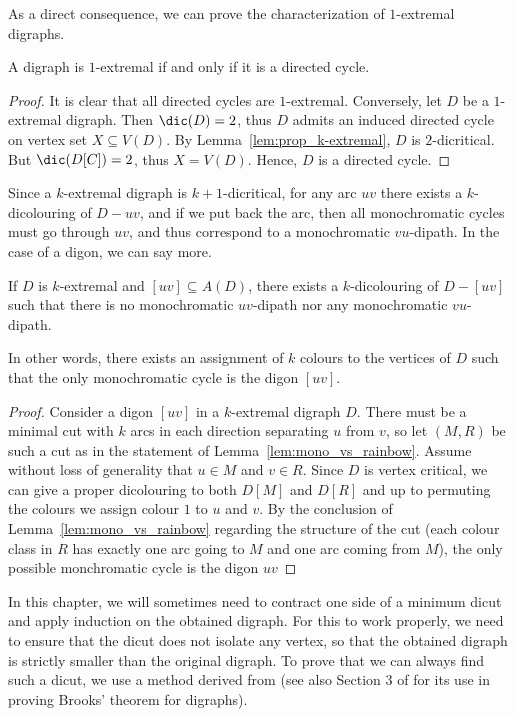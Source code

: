 As a direct consequence, we can prove the characterization of $1$-extremal digraphs.


\begin{theorem}\label{thm:1extremal}
    A digraph is $1$-extremal if and only if it is a directed cycle.
\end{theorem}

\begin{proof}
    It is clear that all directed cycles are $1$-extremal. Conversely, let $D$ be a $1$-extremal digraph. Then $\dic(D) = 2$, thus $D$ admits an induced directed cycle on vertex set $X \subseteq V(D)$. By Lemma~\ref{lem:prop_k-extremal}, $D$ is $2$-dicritical. But $\dic(D[C]) = 2$, thus $X = V(D)$. Hence, $D$ is a directed cycle. 
\end{proof}

Since a $k$-extremal digraph is $k+1$-dicritical, for any arc $uv$ there exists a $k$-dicolouring of $D-uv$, and if we put back the arc, then all monochromatic cycles must go through $uv$, and thus correspond to a monochromatic $vu$-dipath. In the case of a digon, we can say more.
\begin{lemma}\label{lem:extremdigon}
    If $D$ is $k$-extremal and $[uv] \subseteq A(D)$, there exists a $k$-dicolouring of $D-[uv]$ such that there is no monochromatic $uv$-dipath nor any monochromatic $vu$-dipath.
\end{lemma}
In other words, there exists an assignment of $k$ colours to the vertices of $D$ such that the only monochromatic cycle is the digon $[uv]$.
\begin{proof}
Consider a digon $[uv]$ in a $k$-extremal digraph $D$. There must be a minimal cut with $k$ arcs in each direction separating $u$ from $v$, so let $(M,R)$ be such a cut as in the statement of Lemma~\ref{lem:mono_vs_rainbow}. Assume without loss of generality that $u\in M$ and $v\in R$. Since $D$ is vertex critical, we can give a proper dicolouring to both $D[M]$ and $D[R]$ and up to permuting the colours we assign colour $1$ to $u$ and $v$. By the conclusion of Lemma~\ref{lem:mono_vs_rainbow} regarding the structure of the cut (each colour class in $
R$ has exactly one arc going to $M$ and one arc coming from $M$), the only possible monchromatic cycle is the digon $uv$
\end{proof}

In this chapter, we will sometimes need to contract one side of a minimum dicut and apply induction on the obtained digraph. For this to work properly, we need to ensure that the dicut does not isolate any vertex, so that the obtained digraph is strictly smaller than the original digraph. To prove that we can always find such a dicut, we use a method derived from \cite{R14} (see also Section 3 of \cite{AA22} for its use in proving Brooks' theorem for digraphs).

